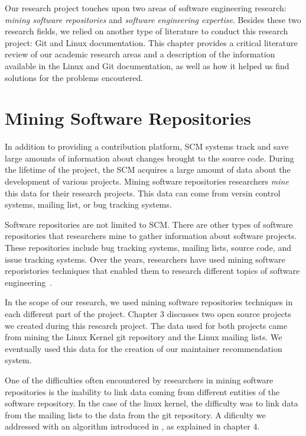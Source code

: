 \label{sec:RevLitt}


Our research project touches upon two areas of software engineering research: \textit{mining software repositories} and \textit{software engineering expertise}. Besides these two research fields, we relied on another type of literature to conduct this research project: Git and Linux documentation. This chapter provides a critical literature review of our academic research areas and a description of the information available in the Linux and Git documentation, as well as how it helped us find solutions for the problems encoutered.



\section{Mining Software Repositories}

In addition to providing a contribution platform, \ac{SCM} systems track and save large amounts of information about changes brought to the source code. During the lifetime of the project, the \ac{SCM} acquires a large amount of data about the development of various projects. Mining software repositories researchers \textit{mine} this data for their research projects. This data can come from versin control systems, mailing list, or bug tracking systems.

Software repositories are not limited to \ac{SCM}. There are other types of software repositories that researchers mine to gather information about software projects. These repositories include bug tracking systems, mailing lists, source code, and issue tracking systems. Over the years, researchers have used mining software reporistories techniques that enabled them to research different topics of software engineering~\citep{Bird-2009}.

In the scope of our research, we used mining software repositories techniques in each different part of the project. Chapter 3 discusses two open source projects we created during this research project. The data used for both projects came from mining the Linux Kernel git repository and the Linux mailing lists. We eventually used this data for the creation of our maintainer recommendation system.

One of the difficulties often encountered by researchers in mining software repositories is the inability to link data coming from different entities of the software repository. In the case of the linux kernel, the difficulty was to link data from the mailing lists to the data from the git repository. A dificulty we addressed with an algorithm introduced in \citep{msr13jojo,jiang14}, as explained in chapter 4. 

